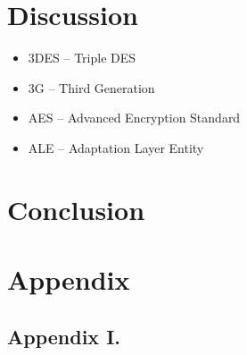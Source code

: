 \documentclass[twoside,12pt,a4paper]{article}
\begin{document}
\section{Discussion}
\begin{itemize}[nolistsep]
    \item 3DES -- Triple DES
    \item 3G -- Third Generation
    \item AES -- Advanced Encryption Standard
    \item ALE -- Adaptation Layer Entity
\end{itemize}


\section{Conclusion}

\clearpage
\lhead{}\rhead{}
{}



\clearpage

\section{Appendix}
\subsection{Appendix I.}
\end{document}
